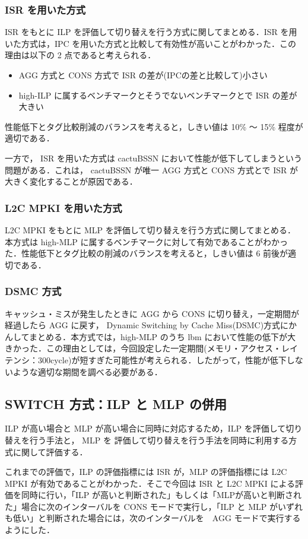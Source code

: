 \documentclass[twocolumn]{jsarticle}
\begin{document}
  \subsubsection{ISR を用いた方式}
  ISR をもとに ILP を評価して切り替えを行う方式に関してまとめる．ISR を用いた方式は，IPC を用いた方式と比較して有効性が高いことがわかった．この理由は以下の 2 点であると考えられる．
  \begin{itemize}
    \item AGG 方式と CONS 方式で ISR の差が(IPCの差と比較して)小さい
    \item high-ILP に属するベンチマークとそうでないベンチマークとで ISR の差が大きい
  \end{itemize}
  性能低下とタグ比較削減のバランスを考えると，しきい値は 10\% ～ 15\% 程度が適切である．

  一方で， ISR を用いた方式は cactuBSSN において性能が低下してしまうという問題がある．これは， cactuBSSN が唯一 AGG 方式と CONS 方式とで ISR が大きく変化することが原因である．

  \subsubsection{L2C MPKI を用いた方式}
  L2C MPKI をもとに MLP を評価して切り替えを行う方式に関してまとめる．本方式は high-MLP に属するベンチマークに対して有効であることがわかった．性能低下とタグ比較の削減のバランスを考えると，しきい値は 6 前後が適切である．

  \subsubsection{DSMC 方式}
  キャッシュ・ミスが発生したときに AGG から CONS に切り替え，一定期間が経過したら AGG に戻す， Dynamic Switching by Cache Miss(DSMC)方式にかんしてまとめる．本方式では，high-MLP のうち lbm において性能の低下が大きかった．この理由としては，今回設定した一定期間(メモリ・アクセス・レイテンシ：300cycle)が短すぎた可能性が考えられる．したがって，性能が低下しないような適切な期間を調べる必要がある．

  \subsection{SWITCH 方式：ILP と MLP の併用}
  ILP が高い場合と MLP が高い場合に同時に対応するため，ILP を評価して切り替えを行う手法と， MLP を 評価して切り替えを行う手法を同時に利用する方式に関して評価する．

  これまでの評価で，ILP の評価指標には ISR が，MLP の評価指標には L2C MPKI が有効であることがわかった．そこで今回は ISR と L2C MPKI による評価を同時に行い，「ILP が高いと判断された」もしくは「MLPが高いと判断された」場合に次のインターバルを CONS モードで実行し，「ILP と MLP がいずれも低い」と判断された場合には，次のインターバルを　AGG モードで実行するようにした．
\end{document}

